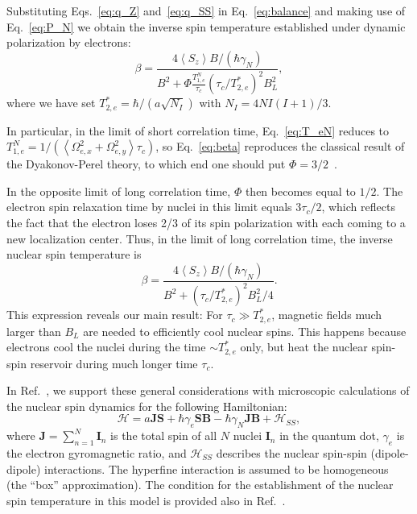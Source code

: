 \documentclass[prl,nobibnotes,twocolumn,aps,longbibliography,superscriptaddress,notoc]{revtex4-1}
\newcommand{\braket}[1]{\left\langle #1 \right\rangle}
\begin{document}
Substituting Eqs.~\eqref{eq:q_Z} and~\eqref{eq:q_SS} in Eq.~\eqref{eq:balance} and making use of Eq.~\eqref{eq:P_N} we obtain the inverse spin temperature established under dynamic polarization by electrons:
\begin{equation}
  \label{eq:beta}
  \beta=\frac{4\braket{S_z}B/(\hbar\gamma_N)}{B^2+\Phi\frac{T_{1,e}^N}{\tau_c}(\tau_c/T_{2,e}^*)^2B_L^2},
\end{equation}
where we have set $T_{2,e}^*=\hbar/(a\sqrt{N_I})$ with $N_I=4NI(I+1)/3$.

In particular, in the limit of short correlation time, Eq.~\eqref{eq:T_eN} reduces to $T_{1,e}^N=1/\left(\braket{\Omega_{e,x}^2+\Omega_{e,y}^2}\tau_c\right)$, so Eq.~\eqref{eq:beta} reproduces the classical result of the Dyakonov-Perel theory, to which end one should put $\Phi=3/2$~\cite{dp74,abragam,OptOrCh2}.

In the opposite limit of long correlation time, $\Phi$ then becomes equal to $1/2$. The electron spin relaxation time by nuclei in this limit equals $3\tau_c/2$, which reflects the fact that the electron loses 2/3 of its spin polarization with each coming to a new localization center. Thus, in the limit of long correlation time, the inverse nuclear spin temperature is
\begin{equation}
  \label{eq:betalong}
  \beta=\frac{4\braket{S_z}B/(\hbar\gamma_N)}{B^2+\left(\tau_c/T_{2,e}^*\right)^2B_L^2/4}.
\end{equation}
This expression reveals our main result: For $\tau_c\gg T_{2,e}^*$, magnetic fields much larger than $B_L$ are needed to efficiently cool nuclear spins. This happens because electrons cool the nuclei during the time $\sim T_{2,e}^*$ only, but heat the nuclear spin-spin reservoir during much longer time $\tau_c$.

In Ref.~, we support these general considerations with microscopic calculations of the nuclear spin dynamics for the following Hamiltonian:
\begin{equation}
  \label{eq:interaction}
  \mathcal H=a\bm J\bm S+\hbar\gamma_e\bm{SB}-\hbar\gamma_N\bm{JB}+\mathcal H_{SS},
\end{equation}
where $\bm J=\sum_{n=1}^N\bm I_n$ is the total spin of all $N$ nuclei $\bm I_n$ in the quantum dot, $\gamma_e$ is the electron gyromagnetic ratio, and $\mathcal H_{SS}$ describes the nuclear spin-spin (dipole-dipole) interactions. The hyperfine interaction is assumed to be homogeneous (the ``box'' approximation). The condition for the establishment of the nuclear spin temperature in this model is provided also in Ref.~.
\end{document}
